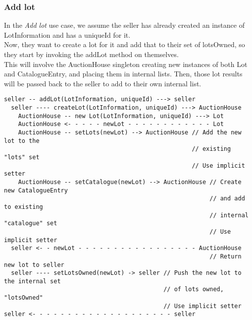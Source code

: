 \documentclass[titlepage, 12pt]{extarticle}
\begin{document}
\subsubsection{Add lot}
In the {\it Add lot} use case, we assume the seller has already created an instance of LotInformation and has a uniqueId for it.\\
Now, they want to create a lot for it and add that to their set of lotsOwned, so they start by invoking the addLot method on themselves.\\
This will involve the AuctionHouse singleton creating new instances of both Lot and CatalogueEntry, and placing them in internal lists. Then, those lot results will be passed back to the seller to add to their own internal list.
\begin{verbatim}
seller -- addLot(LotInformation, uniqueId) ---> seller
  seller ---- createLot(LotInformation, uniqueId) ---> AuctionHouse
    AuctionHouse -- new Lot(LotInformation, uniqueId) ---> Lot
    AuctionHouse <- - - - - newLot - - - - - - - - - - - - Lot
    AuctionHouse -- setLots(newLot) --> AuctionHouse // Add the new lot to the
                                                     // existing "lots" set
                                                     // Use implicit setter
    AuctionHouse -- setCatalogue(newLot) --> AuctionHouse // Create new CatalogueEntry
                                                          // and add to existing
                                                          // internal "catalogue" set
                                                          // Use implicit setter
  seller <- - newLot - - - - - - - - - - - - - - - - - AuctionHouse
                                                          // Return new lot to seller
  seller ---- setLotsOwned(newLot) -> seller // Push the new lot to the internal set
                                             // of lots owned, "lotsOwned"
                                             // Use implicit setter
seller <- - - - - - - - - - - - - - - - - - - - seller
\end{verbatim}
\end{document}
